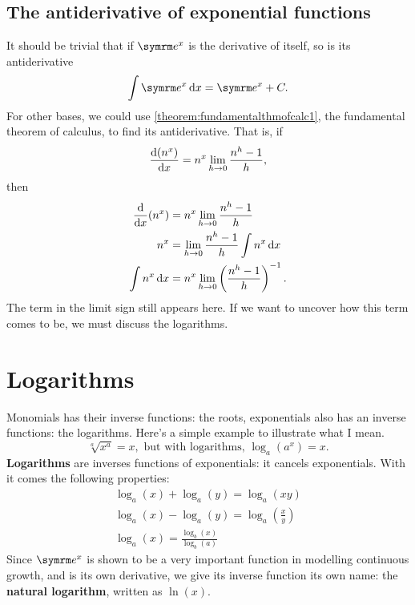 \subsection{The antiderivative of exponential functions}

It should be trivial that if $\e^x$ is the derivative of itself, so is its antiderivative
\begin{equation}
    \int \e^x \odif{x} = \e^x + C.
\end{equation}
For other bases, we could use \cref{theorem:fundamentalthmofcalc1}, the fundamental theorem of calculus, to find its antiderivative. That is, if
\begin{equation*}
    \odv{(n^x)}{x} = n^x\lim_{h \appr 0}\frac{n^h - 1}{h},
\end{equation*}
then
\begin{align*}
    \odv*{(n^x)}{x} &= n^x\lim_{h \appr 0}\frac{n^h - 1}{h} \\
    n^x &= \lim_{h \appr 0}\frac{n^h - 1}{h}\int n^x\odif{x} \\
    \int n^x\odif{x} &= n^x\lim_{h \appr 0}\left(\frac{n^h - 1}{h}\right)^{-1}.
\end{align*}
The term in the limit sign still appears here. If we want to uncover how this term comes to be, we must discuss the logarithms.

\section{Logarithms}

Monomials has their inverse functions: the roots, exponentials also has an inverse functions: the logarithms. Here's a simple example to illustrate what I mean.
\begin{equation*}
    \sqrt[a]{x^a} = x, \textrm{ but with logarithms, } \log_{a}(a^x) = x.
\end{equation*}
\textbf{Logarithms} are inverses functions of exponentials: it cancels exponentials. With it comes the following properties:
\begin{gather}
    \log_a(x) + \log_a(y) = \log_a(xy) \\
    \log_a(x) - \log_a(y) = \log_a\left(\frac{x}{y}\right) \\
    \log_a(x) = \frac{\log_b(x)}{\log_b(a)}
\end{gather}
Since $\e^x$ is shown to be a very important function in modelling continuous growth, and is its own derivative, we give its inverse function its own name: the \textbf{natural logarithm}, written as $\ln(x)$.

